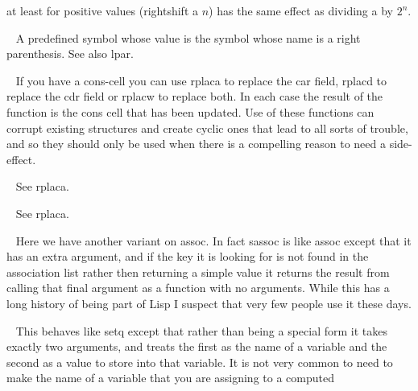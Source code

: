 \begin{description}
at least for positive values {\tx (rightshift a $n$)} has the same
effect as dividing {\tx a} by $2^{n}$.
\item[{\tx rpar~~~~~~~~~} \hspace{1cm} {\em predefined variable}]~\newline
A predefined symbol whose value is the symbol whose name is a right
parenthesis. See also {\tx lpar}.
\item[{\tx rplaca~~~~~~~} \hspace{1cm} {\em function 2 args}]~\newline
If you have a {\tx cons}-cell you can use {\tx rplaca} to replace the
{\tx car} field, {\tx rplacd} to replace the {\tx cdr} field or
{\tx rplacw} to replace both. In each case the result of the function is the
{\tx cons} cell that has been updated. Use of these functions can corrupt
existing structures and create cyclic ones that lead to all sorts of trouble,
and so they should only be used when there is a compelling reason to need
a side-effect.
\item[{\tx rplacd~~~~~~~} \hspace{1cm} {\em function 2 args}]~\newline
See {\tx rplaca}.
\item[{\tx rplacw~~~~~~~} \hspace{1cm} {\em function 2 args}]~\newline
See {\tx rplaca}.
\item[{\tx sassoc~~~~~~~} \hspace{1cm} {\em function 3 args}]~\newline
Here we have another variant on {\tx assoc}. In fact {\tx sassoc} is like
{\tx assoc} except that it has an extra argument, and if the key it is looking
for is not found in the association list rather then returning a simple value
\nil{} it returns the result from calling that final argument as a function
with no arguments. While this has a long history of being part of Lisp
I suspect that very few people use it these days.
\item[{\tx set~~~~~~~~~~} \hspace{1cm} {\em function 2 args}]~\newline
This behaves like {\tx setq} except that rather than being a special form it
takes exactly two arguments, and treats the first as the name of a variable
and the second as a value to store into that variable. It is not very common
to need to make the name of a variable that you are assigning to a computed

\end{description}
